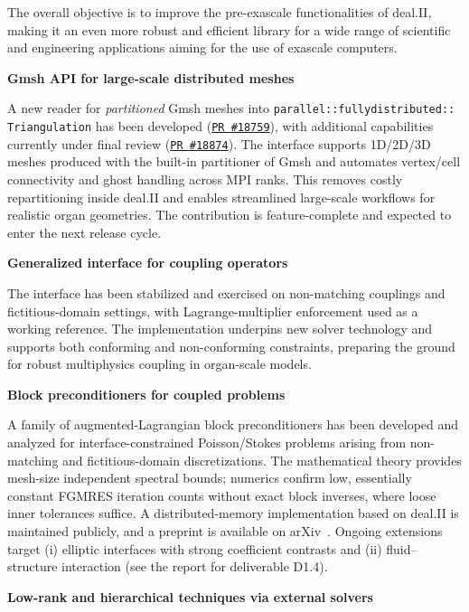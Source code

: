 \documentclass[a4paper,12pt, numbers]{article}
\begin{document}
The overall objective is to improve the pre-exascale functionalities of deal.II,
making it an even more robust and efficient library for a wide range of
scientific and engineering applications aiming for the use of exascale
computers.

\noindent\textbf{Gmsh API for large-scale distributed meshes}

A new reader for \emph{partitioned} Gmsh meshes into
\texttt{parallel::fullydistributed::\\Triangulation} has been developed
(\href{https://github.com/dealii/dealii/pull/18759}{\texttt{PR \#18759}}), with additional capabilities currently under final review (\href{https://github.com/dealii/dealii/pull/18874}{\texttt{PR \#18874}}). The interface supports 1D/2D/3D meshes produced with
the built-in partitioner of Gmsh and
automates vertex/cell connectivity and ghost handling across MPI ranks. This
removes costly repartitioning inside deal.II and enables streamlined
large-scale workflows for realistic organ geometries. The contribution is
feature-complete and expected to enter the next release cycle.

\noindent\textbf{Generalized interface for coupling operators} 

The interface has been stabilized and exercised on non-matching couplings and fictitious-domain settings, with Lagrange-multiplier enforcement used as a working reference. The implementation underpins new solver technology and supports both conforming and non-conforming constraints, preparing the ground for robust multiphysics coupling in organ-scale models.

\noindent\textbf{Block preconditioners for coupled problems}

A family of augmented-Lagrangian block preconditioners has been developed and
analyzed for interface-constrained Poisson/Stokes problems arising from
non-matching and fictitious-domain discretizations. The mathematical theory provides mesh-size
independent spectral bounds; numerics confirm low, essentially constant FGMRES
iteration counts without exact block inverses, where loose inner tolerances suffice.
A distributed-memory implementation based on deal.II is maintained publicly, and
a preprint is available on arXiv~\cite{ALprec}. Ongoing extensions target (i) elliptic
interfaces with strong coefficient contrasts and (ii) fluid–struc\-ture
interaction (see the report for deliverable D1.4).

\noindent\textbf{Low-rank and hierarchical techniques via external solvers}
\end{document}
